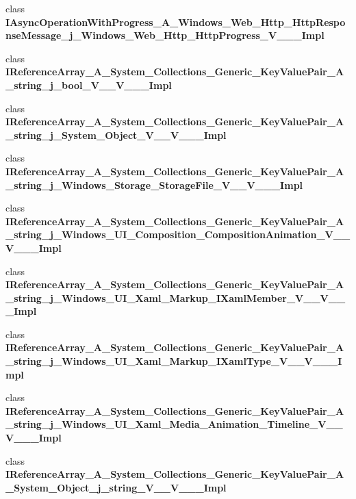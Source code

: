 \begin{DoxyCompactItemize}
\item 
class {\bfseries I\+Async\+Operation\+With\+Progress\+\_\+\+A\+\_\+\+Windows\+\_\+\+Web\+\_\+\+Http\+\_\+\+Http\+Response\+Message\+\_\+j\+\_\+\+Windows\+\_\+\+Web\+\_\+\+Http\+\_\+\+Http\+Progress\+\_\+\+V\+\_\+\+\_\+\+\_\+\+Impl}
\item 
class {\bfseries I\+Reference\+Array\+\_\+\+A\+\_\+\+System\+\_\+\+Collections\+\_\+\+Generic\+\_\+\+Key\+Value\+Pair\+\_\+\+A\+\_\+string\+\_\+j\+\_\+bool\+\_\+\+V\+\_\+\+\_\+\+V\+\_\+\+\_\+\+\_\+\+Impl}
\item 
class {\bfseries I\+Reference\+Array\+\_\+\+A\+\_\+\+System\+\_\+\+Collections\+\_\+\+Generic\+\_\+\+Key\+Value\+Pair\+\_\+\+A\+\_\+string\+\_\+j\+\_\+\+System\+\_\+\+Object\+\_\+\+V\+\_\+\+\_\+\+V\+\_\+\+\_\+\+\_\+\+Impl}
\item 
class {\bfseries I\+Reference\+Array\+\_\+\+A\+\_\+\+System\+\_\+\+Collections\+\_\+\+Generic\+\_\+\+Key\+Value\+Pair\+\_\+\+A\+\_\+string\+\_\+j\+\_\+\+Windows\+\_\+\+Storage\+\_\+\+Storage\+File\+\_\+\+V\+\_\+\+\_\+\+V\+\_\+\+\_\+\+\_\+\+Impl}
\item 
class {\bfseries I\+Reference\+Array\+\_\+\+A\+\_\+\+System\+\_\+\+Collections\+\_\+\+Generic\+\_\+\+Key\+Value\+Pair\+\_\+\+A\+\_\+string\+\_\+j\+\_\+\+Windows\+\_\+\+U\+I\+\_\+\+Composition\+\_\+\+Composition\+Animation\+\_\+\+V\+\_\+\+\_\+\+V\+\_\+\+\_\+\+\_\+\+Impl}
\item 
class {\bfseries I\+Reference\+Array\+\_\+\+A\+\_\+\+System\+\_\+\+Collections\+\_\+\+Generic\+\_\+\+Key\+Value\+Pair\+\_\+\+A\+\_\+string\+\_\+j\+\_\+\+Windows\+\_\+\+U\+I\+\_\+\+Xaml\+\_\+\+Markup\+\_\+\+I\+Xaml\+Member\+\_\+\+V\+\_\+\+\_\+\+V\+\_\+\+\_\+\+\_\+\+Impl}
\item 
class {\bfseries I\+Reference\+Array\+\_\+\+A\+\_\+\+System\+\_\+\+Collections\+\_\+\+Generic\+\_\+\+Key\+Value\+Pair\+\_\+\+A\+\_\+string\+\_\+j\+\_\+\+Windows\+\_\+\+U\+I\+\_\+\+Xaml\+\_\+\+Markup\+\_\+\+I\+Xaml\+Type\+\_\+\+V\+\_\+\+\_\+\+V\+\_\+\+\_\+\+\_\+\+Impl}
\item 
class {\bfseries I\+Reference\+Array\+\_\+\+A\+\_\+\+System\+\_\+\+Collections\+\_\+\+Generic\+\_\+\+Key\+Value\+Pair\+\_\+\+A\+\_\+string\+\_\+j\+\_\+\+Windows\+\_\+\+U\+I\+\_\+\+Xaml\+\_\+\+Media\+\_\+\+Animation\+\_\+\+Timeline\+\_\+\+V\+\_\+\+\_\+\+V\+\_\+\+\_\+\+\_\+\+Impl}
\item 
class {\bfseries I\+Reference\+Array\+\_\+\+A\+\_\+\+System\+\_\+\+Collections\+\_\+\+Generic\+\_\+\+Key\+Value\+Pair\+\_\+\+A\+\_\+\+System\+\_\+\+Object\+\_\+j\+\_\+string\+\_\+\+V\+\_\+\+\_\+\+V\+\_\+\+\_\+\+\_\+\+Impl}

\end{DoxyCompactItemize}
